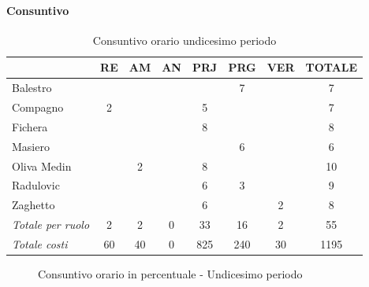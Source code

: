 \documentclass[a4paper,12pt]{article}
\begin{document}
            \paragraph{Consuntivo}
                \begin{table}[H]
                \centering
                \caption{Consuntivo orario undicesimo periodo}
                \begin{tabular}{|l|c|c|c|c|c|c|c|}
                \hline
                    \rowcolor{lightgray}{\textbf{Membro}} & {\textbf{RE}} & {\textbf{AM}} & {\textbf{AN}} & {\textbf{PRJ}} & {\textbf{PRG}} & {\textbf{VER}} & {\textbf{TOTALE}}\\
                \hline
                    Balestro & & & & & 7 & & 7\\
                \hline
                    Compagno & 2 & & & 5 & & & 7\\
                \hline
                    Fichera & & & & 8 & & & 8\\
                \hline
                    Masiero & & & & & 6 & & 6\\
                \hline
                    Oliva Medin & & 2 & & 8 & & & 10\\
                \hline
                    Radulovic & & & & 6 & 3 & & 9\\
                \hline
                    Zaghetto & & & & 6 & & 2 & 8\\
                \hline
                    \rowcolor{lightgray}\textit{Totale per ruolo} & 2 & 2 & 0 & 33 & 16 & 2 & 55\\
                \hline
                    \rowcolor{lightgray}\textit{Totale costi} & 60 & 40 & 0 & 825 & 240 & 30 & 1195\\
                \hline
                \end{tabular}
                \end{table}

                \begin{figure}[H]
                \centering
                \caption{Consuntivo orario in percentuale - Undicesimo periodo}
                \end{figure}
                
\end{document}
